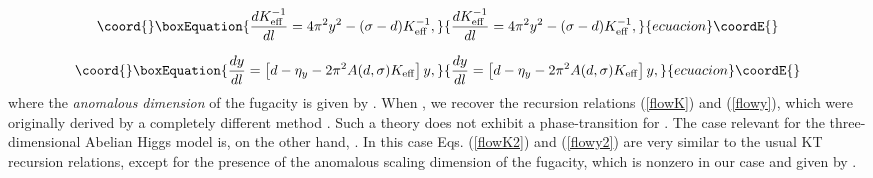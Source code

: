 \documentclass[a4paper,showpacs,preprintnumbers,amsmath,amssymb,prl,twocolumn]{revtex4}
\begin{document}
\begin{equation}\coord{}\boxEquation{
\label{flowK2}
\frac{d K_{\rm eff}^{-1}}{dl}=4\pi^2y^2-(\sigma-d)K_{\rm eff}^{-1},
}{
\frac{d K_{\rm eff}^{-1}}{dl}=4\pi^2y^2-(\sigma-d)K_{\rm eff}^{-1},
}{ecuacion}\coordE{}\end{equation}

\begin{equation}\coord{}\boxEquation{
\label{flowy2}
\frac{dy}{dl}=\left[d-\eta_y-2\pi^2A(d,\sigma)K_{\rm eff}\right]y,
}{
\frac{dy}{dl}=\left[d-\eta_y-2\pi^2A(d,\sigma)K_{\rm eff}\right]y,
}{ecuacion}\coordE{}\end{equation}
where the {\it anomalous dimension} of the fugacity is given by 
\coordHE{}. When \coordHE{}, we recover the recursion relations 
(\ref{flowK}) and (\ref{flowy}), which were originally derived by a 
completely different method \cite{Kosterlitz}. Such a theory does not 
exhibit a phase-transition for \coordHE{}. The case relevant for the three-dimensional 
Abelian Higgs model is, on the other hand, \coordHE{}. In this case 
Eqs. (\ref{flowK2}) and (\ref{flowy2}) are very similar to the usual KT 
recursion relations, except for the presence of the anomalous scaling 
dimension of the fugacity, \coordHE{} which is nonzero in our case and 
given by \coordHE{}. 
\end{document}
